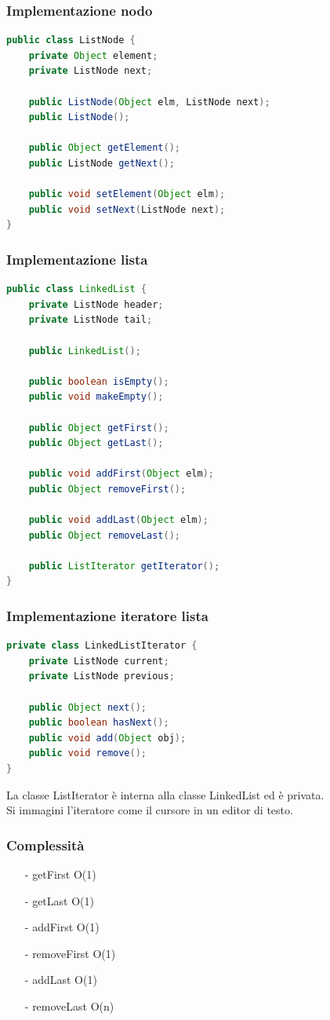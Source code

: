 \documentclass[a4paper]{article}
\begin{document}
\subsubsection*{Implementazione nodo}
\begin{lstlisting}[language=Java]
public class ListNode {
	private Object element;
	private ListNode next;

	public ListNode(Object elm, ListNode next);
	public ListNode();

	public Object getElement();
	public ListNode getNext();

	public void setElement(Object elm);
	public void setNext(ListNode next);
}
\end{lstlisting}

\subsubsection*{Implementazione lista}
\begin{lstlisting}[language=Java]
public class LinkedList {
	private ListNode header;
	private ListNode tail;

	public LinkedList();

	public boolean isEmpty();
	public void makeEmpty();

	public Object getFirst();
	public Object getLast();

	public void addFirst(Object elm);
	public Object removeFirst();

	public void addLast(Object elm);
	public Object removeLast();

	public ListIterator getIterator();
}
\end{lstlisting}

\subsubsection*{Implementazione iteratore lista}
\begin{lstlisting}[language=Java]
private class LinkedListIterator {
	private ListNode current;
	private ListNode previous;

	public Object next();
	public boolean hasNext();
	public void add(Object obj);
	public void remove();
}
\end{lstlisting}
La classe ListIterator è interna alla classe LinkedList ed è privata. \\
Si immagini l'iteratore come il cursore in un editor di testo.

\subsubsection*{Complessità}
\begin{itemize} [topsep=3pt, itemsep=0pt]
	\item[-] getFirst O(1)
	\item[-] getLast O(1)
	\item[-] addFirst O(1)
	\item[-] removeFirst O(1)
	\item[-] addLast O(1)
	\item[-] removeLast O(n)
\end{itemize}
\end{document}
